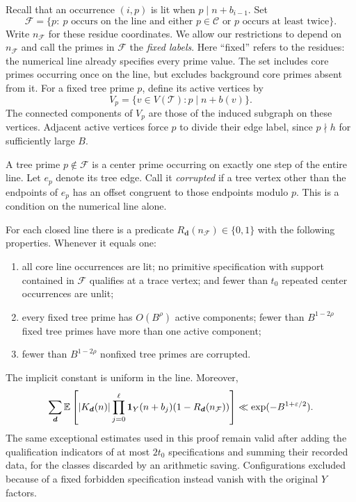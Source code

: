 Recall that an occurrence $(i,p)$ is lit when
$p\mid n+b_{i-1}$.  Set
\begin{equation}\label{eq:fixed-line-labels}
 \mathcal F=\{p:\ p\text{ occurs on the line and either }
        p\in\mathcal C\text{ or }p\text{ occurs at least twice}\}.
\end{equation}
Write $n_{\mathcal F}$ for these residue coordinates.  We allow our
restrictions to depend on $n_{\mathcal F}$ and call the primes in
$\mathcal F$ the \emph{fixed labels}.  Here ``fixed'' refers to the
residues: the numerical line already specifies every prime value.
The set includes core primes occurring once on the line, but excludes
background core primes absent from it.  For a fixed tree prime $p$,
define its active vertices by
\[
 V_p=\{v\in V(\mathscr T):p\mid n+b(v)\}.
\]
The connected components of $V_p$ are those of the induced subgraph
on these vertices.  Adjacent active vertices force $p$ to divide
their edge label, since $p\nmid h$ for sufficiently large $B$.

A tree prime $p\notin\mathcal F$ is a center prime occurring on
exactly one step of the entire line.  Let $e_p$ denote its tree edge.
Call it \emph{corrupted} if a tree vertex other than the endpoints
of $e_p$ has an offset congruent to those endpoints modulo $p$.
This is a condition on the numerical line alone.

\begin{proposition}\label{prop:retained-lines}
For each closed line there is a predicate
$R_{\boldsymbol d}(n_{\mathcal F})\in\{0,1\}$ with the following
properties.  Whenever it equals one:
\begin{enumerate}
\item all core line occurrences are lit; no primitive specification
with support contained in $\mathcal F$ qualifies at a trace vertex;
and fewer than $t_0$ repeated center occurrences are unlit;
\item every fixed tree prime has $O(B^\rho)$ active components;
fewer than $B^{1-2\rho}$ fixed tree primes have more than one
active component;
\item fewer than $B^{1-2\rho}$ nonfixed tree primes are corrupted.
\end{enumerate}
The implicit constant is uniform in the line.  Moreover,
\begin{equation}\label{eq:retained-line-error}
 \sum_{\boldsymbol d}
  \mathbb E\left[|K_{\boldsymbol d}(n)|
       \prod_{j=0}^{\ell}\mathbf 1_Y(n+b_j)
       (1-R_{\boldsymbol d}(n_{\mathcal F}))\right]
 \ll \exp(-B^{1+\varepsilon/2}).
\end{equation}
The same exceptional estimates used in this proof remain valid
after adding the qualification indicators of at most $2t_0$
specifications and summing their recorded data, for the classes
discarded by an arithmetic saving.  Configurations excluded because
of a fixed forbidden specification instead vanish with the original
$Y$ factors.
\end{proposition}

